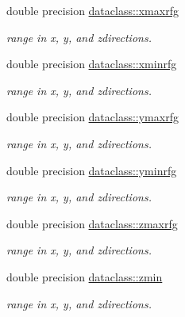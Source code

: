 \textbf{ }\par
\begin{DoxyCompactItemize}
\item 
double precision \mbox{\hyperlink{namespacedataclass_a32b5b26da65d1b3507a36c17029a18ae}{dataclass\+::xmaxrfg}}
\begin{DoxyCompactList}\small\item\em range in x, y, and zdirections. \end{DoxyCompactList}\item 
double precision \mbox{\hyperlink{namespacedataclass_ab5b5b652fce1e93de12accd3514958a0}{dataclass\+::xminrfg}}
\begin{DoxyCompactList}\small\item\em range in x, y, and zdirections. \end{DoxyCompactList}\item 
double precision \mbox{\hyperlink{namespacedataclass_a79212aa125148748cc4bd5a11fff492f}{dataclass\+::ymaxrfg}}
\begin{DoxyCompactList}\small\item\em range in x, y, and zdirections. \end{DoxyCompactList}\item 
double precision \mbox{\hyperlink{namespacedataclass_a5393ad3032e6f0311c62d03d468a6cf0}{dataclass\+::yminrfg}}
\begin{DoxyCompactList}\small\item\em range in x, y, and zdirections. \end{DoxyCompactList}\item 
double precision \mbox{\hyperlink{namespacedataclass_a52b6a1ee39c205fce4ef2be72ab153aa}{dataclass\+::zmaxrfg}}
\begin{DoxyCompactList}\small\item\em range in x, y, and zdirections. \end{DoxyCompactList}\item 
double precision \mbox{\hyperlink{namespacedataclass_a9c2398fd87701d5c0de37ff6b3357a0c}{dataclass\+::zmin}}
\begin{DoxyCompactList}\small\item\em range in x, y, and zdirections. \end{DoxyCompactList}\end{DoxyCompactItemize}


